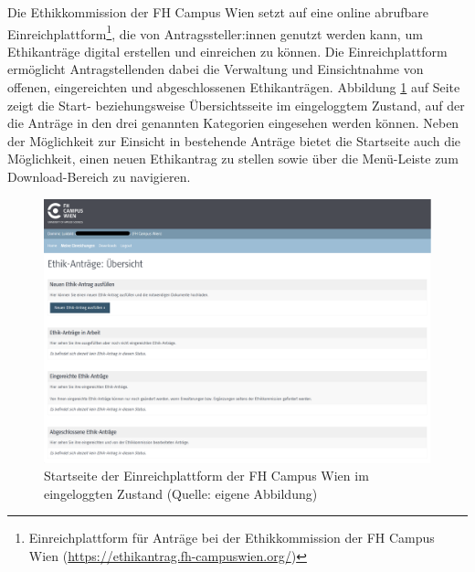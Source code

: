 \documentclass[a4paper,12pt,twoside]{scrreprt}
\begin{document}
Die Ethikkommission der FH Campus Wien setzt auf eine online abrufbare Einreichplattform\footnote{Einreichplattform für Anträge bei der Ethikkommission der FH Campus Wien (\url{https://ethikantrag.fh-campuswien.org/})}, die von Antragssteller:innen genutzt werden kann, um Ethikanträge digital erstellen und einreichen zu können. \cite{ethikkommission_fh_campus_wien_fh_2023} Die Einreichplattform ermöglicht Antragstellenden dabei die Verwaltung und Einsichtnahme von offenen, eingereichten und abgeschlossenen Ethikanträgen. Abbildung \ref{fig:startseite-einreichplattform-fhcw} auf Seite \pageref{fig:startseite-einreichplattform-fhcw} zeigt die Start- beziehungsweise Übersichtsseite im eingeloggtem Zustand, auf der die Anträge in den drei genannten Kategorien eingesehen werden können. Neben der Möglichkeit zur Einsicht in bestehende Anträge bietet die Startseite auch die Möglichkeit, einen neuen Ethikantrag zu stellen sowie über die Menü-Leiste zum Download-Bereich zu navigieren.

\begin{figure}[ht]
    \centering
    \includegraphics[width=\linewidth]{thesis/images/Luidold_Einreichplattform-FH-Campus-Wien.png}
    \caption[Startseite der Einreichplattform der FH Campus Wien im eingeloggten Zustand]{Startseite der Einreichplattform der FH Campus Wien im eingeloggten Zustand (Quelle: eigene Abbildung)}
    \label{fig:startseite-einreichplattform-fhcw}
\end{figure}

\medskip 
\end{document}
